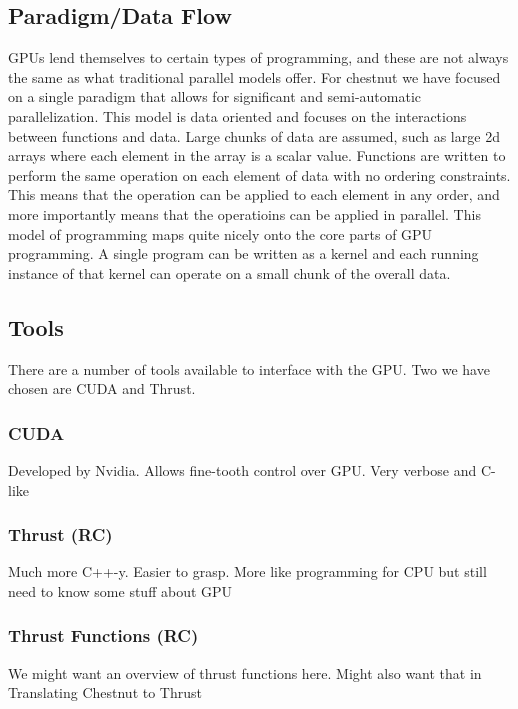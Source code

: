 \documentclass{article}
\renewcommand{\|}{\origbar} %
\begin{document}
\subsection{Paradigm/Data Flow}

GPUs lend themselves to certain types of programming, and these are not always the same as what traditional parallel models offer. For chestnut we have focused on a single paradigm that allows for significant and semi-automatic parallelization. This model is data oriented and focuses on the interactions between functions and data. Large chunks of data are assumed, such as large 2d arrays where each element in the array is a scalar value. Functions are written to perform the same operation on each element of data with no ordering constraints. This means that the operation can be applied to each element in any order, and more importantly means that the operatioins can be applied in parallel. This model of programming maps quite nicely onto the core parts of GPU programming. A single program can be written as a kernel and each running instance of that kernel can operate on a small chunk of the overall data.

\subsection{Tools}

There are a number of tools available to interface with the GPU. Two we have chosen are CUDA and Thrust.

\subsubsection{CUDA}

Developed by Nvidia. Allows fine-tooth control over GPU. Very verbose and C-like

\subsubsection{Thrust (RC)}

Much more C++-y. Easier to grasp. More like programming for CPU but still need to know some stuff about GPU

\subsubsection{Thrust Functions (RC)}

We might want an overview of thrust functions here. Might also want that in Translating Chestnut to Thrust
\end{document}
